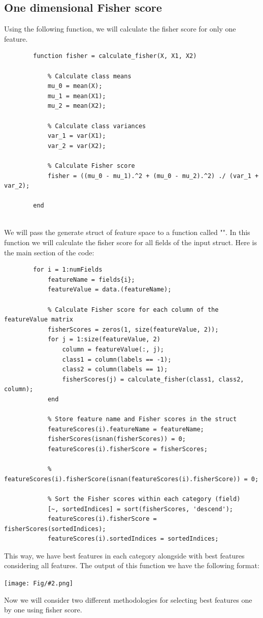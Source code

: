 \documentclass[]{article}
\newcommand{\pict}[2]{\begin{center}
		\texttt{[image: Fig/\#2.png]}
\end{center}}
\begin{document}
	\subsection{One dimensional Fisher score}
	Using the following function, we will calculate the fisher score for only one feature.
	\begin{lstlisting}
		function fisher = calculate_fisher(X, X1, X2)
		
			% Calculate class means
			mu_0 = mean(X);
			mu_1 = mean(X1);
			mu_2 = mean(X2);
			
			% Calculate class variances
			var_1 = var(X1);
			var_2 = var(X2);
			
			% Calculate Fisher score
			fisher = ((mu_0 - mu_1).^2 + (mu_0 - mu_2).^2) ./ (var_1 + var_2);
			
		end
		
	\end{lstlisting}
	We will pass the generate struct of feature space to a function called "". In this function we will calculate the fisher score for all fields of the input struct. Here is the main section of the code:
	\begin{lstlisting}
		for i = 1:numFields
			featureName = fields{i};
			featureValue = data.(featureName);
			
			% Calculate Fisher score for each column of the featureValue matrix
			fisherScores = zeros(1, size(featureValue, 2));
			for j = 1:size(featureValue, 2)
				column = featureValue(:, j);
				class1 = column(labels == -1);
				class2 = column(labels == 1);
				fisherScores(j) = calculate_fisher(class1, class2, column);
			end
			
			% Store feature name and Fisher scores in the struct
			featureScores(i).featureName = featureName;
			fisherScores(isnan(fisherScores)) = 0;
			featureScores(i).fisherScore = fisherScores;
			
			%         featureScores(i).fisherScore(isnan(featureScores(i).fisherScore)) = 0;
			
			% Sort the Fisher scores within each category (field)
			[~, sortedIndices] = sort(fisherScores, 'descend');
			featureScores(i).fisherScore = fisherScores(sortedIndices);
			featureScores(i).sortedIndices = sortedIndices;
	\end{lstlisting}
	This way, we have best features in each category alongside with best features considering all features. The output of this function we have the following format:
	\pict{0.5}{F4}
	Now we will consider two different methodologies for selecting best features one by one using fisher score.
\end{document}

